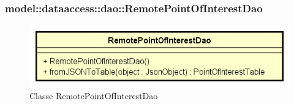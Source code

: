 \documentclass[../DefinizioneDiProdotto.tex]{subfiles}
\begin{document}
\subsubsection{model::dataaccess::dao::RemotePointOfInterestDao}

    \begin{figure}[H]
        \centering
        \includegraphics{img/RemotePointOfInterestDao.png}
        \caption{Classe RemotePointOfInterestDao}\label{fig:model::dataaccess::dao::RemotePointOfInterestDao} 
    \end{figure}
\end{document}
